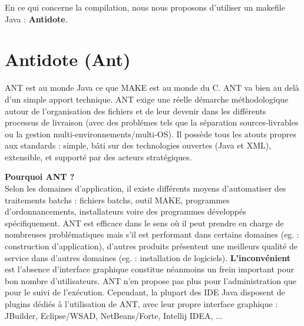 En ce qui concerne la compilation, nous nous proposons d'utiliser un
makefile Java : {\bf Antidote}.\\

\section{Antidote (Ant)}
ANT est au monde Java ce que MAKE est au monde du C. ANT va bien au del{\`a} d'un simple apport technique. ANT exige une r{\'e}elle d{\'e}marche m{\'e}thodologique autour de l'organisation des fichiers et de leur devenir dans les diff{\'e}rents processus de livraison (avec des probl{\'e}mes tels que la s{\'e}paration sources-livrables ou la gestion multi-environnements/multi-OS). Il poss{\`e}de tous les atouts propres aux standards : simple, b{\^a}ti sur des technologies ouvertes (Java et XML), extensible, et support{\'e} par des acteurs strat{\'e}giques. 

{\bf Pourquoi ANT ?}\\
Selon les domaines d'application, il existe diff{\'e}rents moyens
d'automatiser des traitements batchs : fichiers batchs, outil MAKE,
programmes d'ordonnancements, installateurs voire des programmes
d{\'e}velopp{\'e}s sp{\'e}cifiquement.
ANT est efficace dans le sens o{\`u} il peut prendre en charge de
nombreuses probl{\'e}matiques mais s'il est performant dans certains
domaines (eg. : construction d'application), d'autres produits
pr{\'e}sentent une meilleurs qualit{\'e} de service dans d'autres domaines
(eg. : installation de logiciels).
{\bf L'inconv{\'e}nient} est l'absence d'interface graphique constitue n{\'e}anmoins un frein important pour bon nombre d'utilisateurs. ANT n'en propose pas plus pour l'administration que pour le suivi de l'ex{\'e}cution. Cependant, la plupart des IDE Java disposent de plugins d{\'e}di{\'e}s {\`a} l'utilisation de ANT, avec leur propre interface graphique : JBuilder, Eclipse/WSAD, NetBeans/Forte, Intellij IDEA, ...



